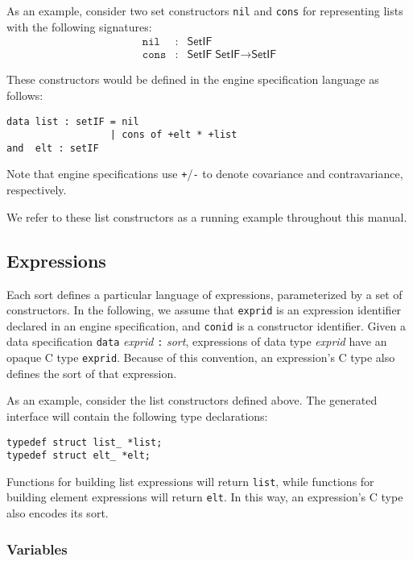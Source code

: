 \documentclass{article}
\def\kw#1{\hbox{\tt #1}}
\newcommand{\SetIF}{\textsf{SetIF}}
\newcommand{\id}[1]{{\it #1\/}}
\begin{document}
As an example, consider two set constructors \texttt{nil} and
\texttt{cons} for representing lists with the following signatures:
$$
\begin{array}{rcl}
        \texttt{nil} & : & \SetIF\\
        \texttt{cons} & : & \SetIF\; \SetIF\rightarrow \SetIF
\end{array}
$$

These constructors would be defined in the engine specification language as follows:

\begin{verbatim}
data list : setIF = nil 
                  | cons of +elt * +list
and  elt : setIF
\end{verbatim}
Note that engine specifications use \texttt{+}/\texttt{-} to denote 
covariance and contravariance, respectively. %

We refer to these list constructors as a running example throughout this 
manual.

\subsection{Expressions}

Each sort defines a particular language of expressions, parameterized by a set
of constructors. In the following, we assume that \texttt{exprid} is an 
expression identifier declared in an engine specification, and \texttt{conid} 
is a constructor identifier. Given a data 
specification \kw{data} \id{exprid} \kw{:} \id{sort}, expressions
of data type \id{exprid} have an opaque C type \kw{exprid}. Because of this 
convention, an expression's C type also defines the sort of that expression.

As an example, consider the list constructors defined above. The generated
interface will contain the following type declarations:

\begin{verbatim}
typedef struct list_ *list;
typedef struct elt_ *elt;
\end{verbatim}

Functions for building list expressions will return \texttt{list}, while 
functions for building element expressions will return \texttt{elt}. In this 
way, an expression's C type also encodes its sort.

\subsubsection{Variables}
\end{document}
